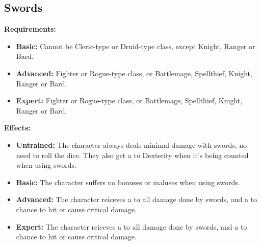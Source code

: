 \documentclass[openany,10pt,a4paper]{book}
\begin{document}
\subsection{Swords}
\begin{table}[!ht]
\centering
{}
\end{table}
\textbf{Requirements:}
\begin{itemize}
	\item \textbf{Basic:} Cannot be Cleric-type or Druid-type class, except Knight, Ranger or Bard.
	\item \textbf{Advanced:} Fighter or Rogue-type class, or Battlemage, Spellthief, Knight, Ranger or Bard.
	\item \textbf{Expert:} Fighter or Rogue-type class, or Battlemage, Spellthief, Knight, Ranger or Bard.
\end{itemize}
\textbf{Effects:}
\begin{itemize}
	\item \textbf{Untrained:} The character always deals minimal damage with swords, no need to roll the dice. They also get a  to Dexterity when it's being counted when using swords.
	\item \textbf{Basic:} The character suffers no bonuses or maluses when using swords.
	\item \textbf{Advanced:} The character reiceves a  to all damage done by swords, and a  to chance to hit or cause critical damage.
	\item \textbf{Expert:} The character reiceves a  to all damage done by swords, and a  to chance to hit or cause critical damage.
\end{itemize}\newpage
\end{document}
